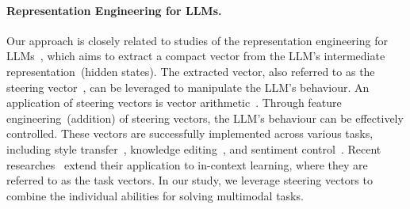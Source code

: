 \paragraph{Representation Engineering for LLMs.}
Our approach is closely related to studies of the representation engineering for LLMs~\cite{zou2023representation,turner2023activation}, which aims to extract a compact vector from the LLM's intermediate representation~(\eg hidden states). The extracted vector, also referred to as the steering vector~\cite{subramani2022extracting}, can be leveraged to manipulate the LLM's behaviour. An application of steering vectors is vector arithmetic~\cite{ilharco2022editing,turner2023activation}.
Through feature engineering~(\eg addition) of steering vectors, the LLM's behaviour can be effectively controlled.
These vectors are successfully implemented across various tasks, including style transfer~\cite{subramani2022extracting}, knowledge editing~\cite{hernandez2023inspecting}, and sentiment control~\cite{turner2023activation}. Recent researches~\cite{hendel2023context,liu2023context} extend their application to in-context learning, where they are referred to as the task vectors. In our study, we leverage steering vectors to combine the individual abilities for solving multimodal tasks.






